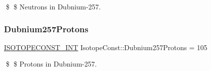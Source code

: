 \$ \$ Neutrons in Dubnium-\/257. \mbox{\label{group___isotope_const-_dubnium-_db257_ga122a492de466f17a4a67f91bcf3ed765}} 
\subsubsection{\texorpdfstring{Dubnium257\+Protons}{Dubnium257Protons}}
{\footnotesize\ttfamily \mbox{\hyperlink{group___isotope_const-_macros_ga5f18360b3e99483a35c32d789e62621c}{I\+S\+O\+T\+O\+P\+E\+C\+O\+N\+S\+T\+\_\+\+I\+NT}} Isotope\+Const\+::\+Dubnium257\+Protons = 105}

\$ \$ Protons in Dubnium-\/257. 